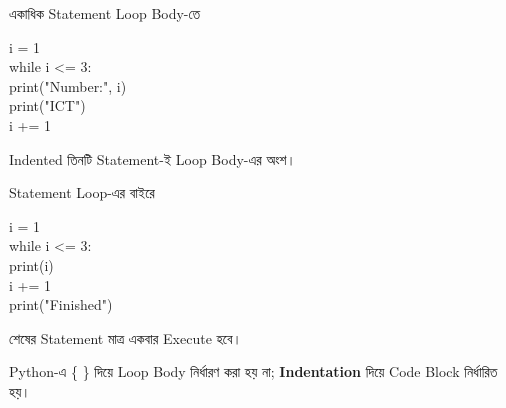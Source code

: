 \noindent
\begin{minipage}[t]{0.49\linewidth}

\begin{sideexamplebox}{একাধিক Statement Loop Body-তে}

\begin{sidecodebox}
\begin{english}
\ttfamily
i = 1\\
while i <= 3:\\
\hspace*{4mm}print("Number:", i)\\
\hspace*{4mm}print("ICT")\\
\hspace*{4mm}i += 1
\end{english}
\end{sidecodebox}

Indented তিনটি Statement-ই Loop Body-এর অংশ।

\end{sideexamplebox}

\end{minipage}
\hfill
\begin{minipage}[t]{0.49\linewidth}

\begin{sideexamplebox}{Statement Loop-এর বাইরে}

\begin{sidecodebox}
\begin{english}
\ttfamily
i = 1\\
while i <= 3:\\
\hspace*{4mm}print(i)\\
\hspace*{4mm}i += 1\\[0.5mm]
print("Finished")
\end{english}
\end{sidecodebox}

শেষের Statement মাত্র একবার Execute হবে।

\end{sideexamplebox}

\end{minipage}

\begin{rememberbox}

Python-এ
\textenglish{\ttfamily \{ \}}
দিয়ে Loop Body নির্ধারণ করা হয় না;
\textbf{Indentation} দিয়ে Code Block নির্ধারিত হয়।

\end{rememberbox}

